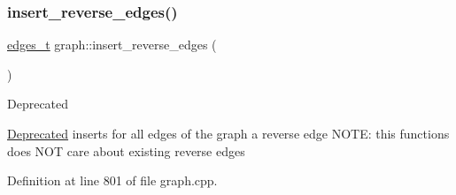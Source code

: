 \subsubsection{\texorpdfstring{insert\+\_\+reverse\+\_\+edges()}{insert\_reverse\_edges()}}
{\footnotesize\ttfamily \mbox{\hyperlink{edge_8h_a8f9587479bda6cf612c103494b3858e3}{edges\+\_\+t}} graph\+::insert\+\_\+reverse\+\_\+edges (\begin{DoxyParamCaption}{ }\end{DoxyParamCaption})\hspace{0.3cm}{\ttfamily [inherited]}}

\begin{DoxyRefDesc}{Deprecated}
\item[\mbox{\hyperlink{deprecated__deprecated000006}{Deprecated}}]inserts for all edges of the graph a reverse edge N\+O\+TE\+: this functions does N\+OT care about existing reverse edges \end{DoxyRefDesc}


Definition at line 801 of file graph.\+cpp.


